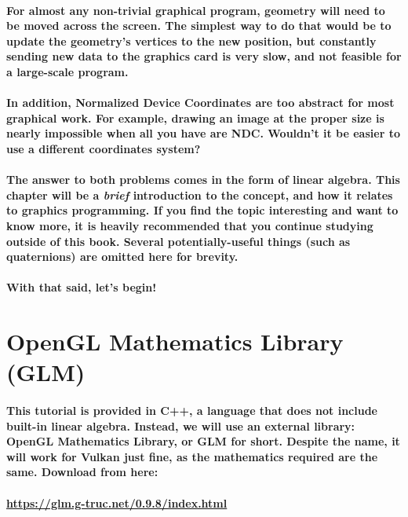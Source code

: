 \paragraph{
    For almost any non-trivial graphical program, geometry will need to be moved across the screen. The simplest way to do that would be to update the geometry's vertices to the new position, but constantly sending new data to the graphics card is very slow, and not feasible for a large-scale program.
}

\paragraph{
    In addition, Normalized Device Coordinates are too abstract for most graphical work. For example, drawing an image at the proper size is nearly impossible when all you have are NDC. Wouldn't it be easier to use a different coordinates system?
}

\paragraph{
    The answer to both problems comes in the form of linear algebra. This chapter will be a \emph{brief} introduction to the concept, and how it relates to graphics programming. If you find the topic interesting and want to know more, it is heavily recommended that you continue studying outside of this book. Several potentially-useful things (such as quaternions) are omitted here for brevity.
}

\paragraph{
    With that said, let's begin!
}

\section{OpenGL Mathematics Library (GLM)}
\paragraph{
    This tutorial is provided in C++, a language that does not include built-in linear algebra. Instead, we will use an external library: OpenGL Mathematics Library, or GLM for short. Despite the name, it will work for Vulkan just fine, as the mathematics required are the same. Download from here:
}

\paragraph{
    \href{https://glm.g-truc.net/0.9.8/index.html}{https://glm.g-truc.net/0.9.8/index.html}
}

